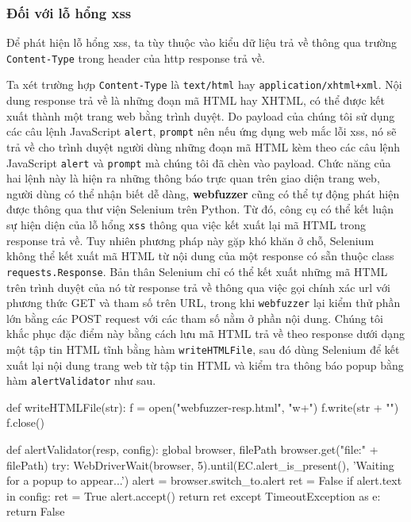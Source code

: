 \subsubsection{Đối với lỗ hổng \acrlong{xss}}
Để phát hiện lỗ hổng \acrshort{xss}, ta tùy thuộc vào kiểu dữ liệu trả về thông qua trường \texttt{Content-Type} trong header của \acrshort{http} response trả về.\par
Ta xét trường hợp \texttt{Content-Type} là \texttt{text/html} hay \texttt{application/xhtml+xml}. Nội dung response trả về là những đoạn mã HTML hay XHTML, có thể được kết xuất thành một trang web bằng trình duyệt. Do payload của chúng tôi sử dụng các câu lệnh JavaScript \texttt{alert}, \texttt{prompt} nên nếu ứng dụng web mắc lỗi \acrshort{xss}, nó sẽ trả về cho trình duyệt người dùng những đoạn mã HTML kèm theo các câu lệnh JavaScript \texttt{alert} và \texttt{prompt} mà chúng tôi đã chèn vào payload. Chức năng của hai lệnh này là hiện ra những thông báo trực quan trên giao diện trang web, người dùng có thể nhận biết dễ dàng, \textbf{webfuzzer} cũng có thể tự động phát hiện được thông qua thư viện Selenium trên Python. Từ đó, công cụ có thể kết luận sự hiện diện của lỗ hổng \texttt{xss} thông qua việc kết xuất lại mã HTML trong response trả về. Tuy nhiên phương pháp này gặp khó khăn ở chỗ, Selenium không thể kết xuất mã HTML từ nội dung của một response có sẵn thuộc class \texttt{requests.Response}. Bản thân Selenium chỉ có thể kết xuất những mã HTML trên trình duyệt của nó từ response trả về thông qua việc gọi chính xác \acrshort{url} với phương thức GET và tham số trên URL, trong khi \texttt{webfuzzer} lại kiểm thử phần lớn bằng các POST request với các tham số nằm ở phần nội dung. Chúng tôi khắc phục đặc điểm này bằng cách lưu mã HTML trả về theo response dưới dạng một tập tin HTML tĩnh bằng hàm \texttt{writeHTMLFile}, sau đó dùng Selenium để kết xuất lại nội dung trang web từ tập tin HTML và kiểm tra thông báo popup bằng hàm \texttt{alertValidator} như sau.\\
\begin{python}
def writeHTMLFile(str):
    f = open("webfuzzer-resp.html", "w+")
    f.write(str + "\n")
    f.close()

def alertValidator(resp, config):
    global browser, filePath
    browser.get("file:" + filePath)
    try:
        WebDriverWait(browser, 5).until(EC.alert_is_present(), 'Waiting for a popup to appear...')
        alert = browser.switch_to.alert
        ret = False
        if alert.text in config: ret = True
        alert.accept()
        return ret
    except TimeoutException as e:
        return False
\end{python}
